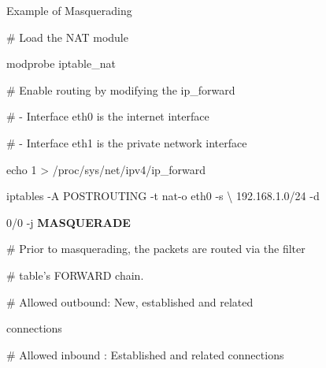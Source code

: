 \begin{frame}[t,allowframebreaks]{Example of Masquerading}
  \fontsize{15}{18}\selectfont
  \vspace{0.08cm}
  {\color{CommandGreen}\ttfamily\fontsize{13.5}{16.5}\selectfont \# Load the NAT module\par}
  \vspace{0.08cm}
  {\color{CommandGreen}\ttfamily\fontsize{13.5}{16.5}\selectfont modprobe iptable\_nat\par}
  \vspace{0.08cm}
  {\color{CommandGreen}\ttfamily\fontsize{13.5}{16.5}\selectfont \# Enable routing by modifying the ip\_forward\par}
  \vspace{0.08cm}
  {\color{CommandGreen}\ttfamily\fontsize{13.5}{16.5}\selectfont \# - Interface eth0 is the internet interface\par}
  \vspace{0.08cm}
  {\color{CommandGreen}\ttfamily\fontsize{13.5}{16.5}\selectfont \# - Interface eth1 is the private network interface\par}
  \vspace{0.08cm}
  {\color{CommandGreen}\ttfamily\fontsize{13.5}{16.5}\selectfont echo 1 > /proc/sys/net/ipv4/ip\_forward\par}
  \vspace{0.08cm}
  {\color{CommandGreen}\ttfamily\fontsize{13.5}{16.5}\selectfont iptables -A POSTROUTING -t nat-o eth0 -s \textbackslash{} 192.168.1.0/24 -d\par}
  0/0 -j \textcolor{WarningColor}{\bfseries MASQUERADE}\par
  \vspace{0.08cm}
  {\color{CommandGreen}\ttfamily\fontsize{13.5}{16.5}\selectfont \# Prior to masquerading, the packets are routed via the filter\par}
  \vspace{0.08cm}
  {\color{CommandGreen}\ttfamily\fontsize{13.5}{16.5}\selectfont \# table's FORWARD chain.\par}
  \vspace{0.08cm}
  {\color{CommandGreen}\ttfamily\fontsize{13.5}{16.5}\selectfont \# Allowed outbound: New, established and related\par}
  connections\par
  \vspace{0.08cm}
  {\color{CommandGreen}\ttfamily\fontsize{13.5}{16.5}\selectfont \# Allowed inbound : Established and related connections\par}

\end{frame}
